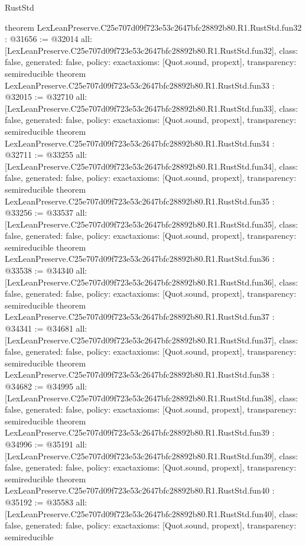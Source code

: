 \begin{lexlean}{RustStd}
\begin{coremodule}
{}
theorem LexLeanPreserve.C25e707d09f723e53c2647bfc28892b80.R1.RustStd.fun32 : @31656 := @32014 {
  all: [LexLeanPreserve.C25e707d09f723e53c2647bfc28892b80.R1.RustStd.fun32],
  class: false,
  generated: false,
  policy: exact{axioms: [Quot.sound, propext]},
  transparency: semireducible
}
theorem LexLeanPreserve.C25e707d09f723e53c2647bfc28892b80.R1.RustStd.fun33 : @32015 := @32710 {
  all: [LexLeanPreserve.C25e707d09f723e53c2647bfc28892b80.R1.RustStd.fun33],
  class: false,
  generated: false,
  policy: exact{axioms: [Quot.sound, propext]},
  transparency: semireducible
}
theorem LexLeanPreserve.C25e707d09f723e53c2647bfc28892b80.R1.RustStd.fun34 : @32711 := @33255 {
  all: [LexLeanPreserve.C25e707d09f723e53c2647bfc28892b80.R1.RustStd.fun34],
  class: false,
  generated: false,
  policy: exact{axioms: [Quot.sound, propext]},
  transparency: semireducible
}
theorem LexLeanPreserve.C25e707d09f723e53c2647bfc28892b80.R1.RustStd.fun35 : @33256 := @33537 {
  all: [LexLeanPreserve.C25e707d09f723e53c2647bfc28892b80.R1.RustStd.fun35],
  class: false,
  generated: false,
  policy: exact{axioms: [Quot.sound, propext]},
  transparency: semireducible
}
theorem LexLeanPreserve.C25e707d09f723e53c2647bfc28892b80.R1.RustStd.fun36 : @33538 := @34340 {
  all: [LexLeanPreserve.C25e707d09f723e53c2647bfc28892b80.R1.RustStd.fun36],
  class: false,
  generated: false,
  policy: exact{axioms: [Quot.sound, propext]},
  transparency: semireducible
}
theorem LexLeanPreserve.C25e707d09f723e53c2647bfc28892b80.R1.RustStd.fun37 : @34341 := @34681 {
  all: [LexLeanPreserve.C25e707d09f723e53c2647bfc28892b80.R1.RustStd.fun37],
  class: false,
  generated: false,
  policy: exact{axioms: [Quot.sound, propext]},
  transparency: semireducible
}
theorem LexLeanPreserve.C25e707d09f723e53c2647bfc28892b80.R1.RustStd.fun38 : @34682 := @34995 {
  all: [LexLeanPreserve.C25e707d09f723e53c2647bfc28892b80.R1.RustStd.fun38],
  class: false,
  generated: false,
  policy: exact{axioms: [Quot.sound, propext]},
  transparency: semireducible
}
theorem LexLeanPreserve.C25e707d09f723e53c2647bfc28892b80.R1.RustStd.fun39 : @34996 := @35191 {
  all: [LexLeanPreserve.C25e707d09f723e53c2647bfc28892b80.R1.RustStd.fun39],
  class: false,
  generated: false,
  policy: exact{axioms: [Quot.sound, propext]},
  transparency: semireducible
}
theorem LexLeanPreserve.C25e707d09f723e53c2647bfc28892b80.R1.RustStd.fun40 : @35192 := @35583 {
  all: [LexLeanPreserve.C25e707d09f723e53c2647bfc28892b80.R1.RustStd.fun40],
  class: false,
  generated: false,
  policy: exact{axioms: [Quot.sound, propext]},
  transparency: semireducible
}
\end{coremodule}
\end{lexlean}
